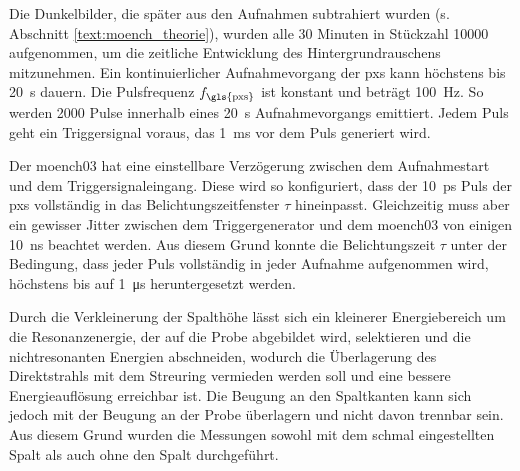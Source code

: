 \noindent
Die Dunkelbilder, die später aus den Aufnahmen subtrahiert wurden (s. Abschnitt \ref{text:moench_theorie}), wurden alle 30 Minuten in Stückzahl \num{10000} aufgenommen, um die zeitliche Entwicklung des Hintergrundrauschens mitzunehmen. Ein kontinuierlicher Aufnahmevorgang der \gls{pxs} kann höchstens bis \SI{20}{\second} dauern. Die Pulsfrequenz $f_\text{\gls{pxs}}$ ist konstant und beträgt \SI{100}{\hertz}. So werden \num{2000} Pulse innerhalb eines \SI{20}{\second} Aufnahmevorgangs emittiert. Jedem Puls geht ein Triggersignal voraus, das \SI{1}{\milli\second} vor dem Puls generiert wird.

\noindent
Der \gls{moench03} hat eine einstellbare Verzögerung zwischen dem Aufnahmestart und dem Triggersignaleingang. Diese wird so konfiguriert, dass der \SI{10}{\pico\second} Puls der \gls{pxs} vollständig in das Belichtungszeitfenster $\tau$ hineinpasst. Gleichzeitig muss aber ein gewisser Jitter zwischen dem Triggergenerator und dem \gls{moench03} von einigen \SI{10}{\nano\second} beachtet werden. Aus diesem Grund konnte die Belichtungszeit $\tau$ unter der Bedingung, dass jeder Puls vollständig in jeder Aufnahme aufgenommen wird, höchstens bis auf \SI{1}{\micro\second} heruntergesetzt werden.

\noindent
Durch die Verkleinerung der Spalthöhe lässt sich ein kleinerer Energiebereich um die Resonanzenergie, der auf die Probe abgebildet wird, selektieren und die nichtresonanten Energien abschneiden, wodurch die Überlagerung des Direktstrahls mit dem Streuring vermieden werden soll und eine bessere Energieauflösung erreichbar ist. Die Beugung an den Spaltkanten kann sich jedoch mit der Beugung an der Probe überlagern und nicht davon trennbar sein. Aus diesem Grund wurden die Messungen sowohl mit dem schmal eingestellten Spalt als auch ohne den Spalt durchgeführt.

